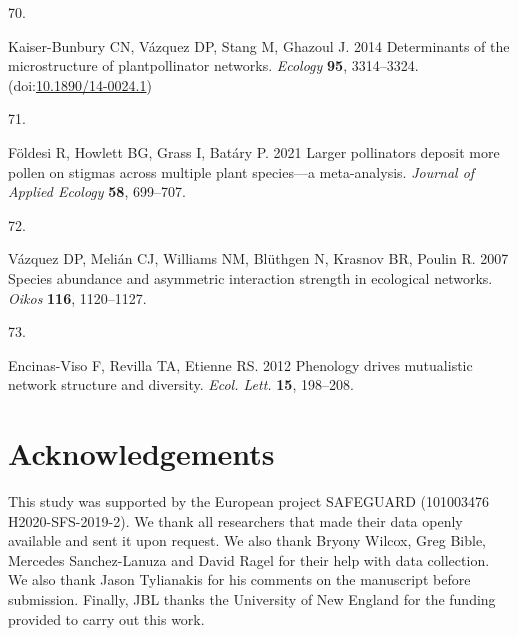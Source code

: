 \documentclass[
  12pt,
  a4paper,
]{article}
\newlength{\cslhangindent}
\newlength{\csllabelwidth}
\newlength{\cslentryspacingunit} %
\newenvironment{CSLReferences}[2] %
 {%
  \setlength{\parindent}{0pt}
  \ifodd #1
  \let\oldpar\par
  \def\par{\hangindent=\cslhangindent\oldpar}
  \fi
  \setlength{\parskip}{#2\cslentryspacingunit}
 }%
 {}
\newcommand{\CSLLeftMargin}[1]{\parbox[t]{\csllabelwidth}{#1}}
\newcommand{\CSLRightInline}[1]{\parbox[t]{\linewidth - \csllabelwidth}{#1}\break}
\begin{document}
\begin{CSLReferences}{0}{0}
\leavevmode{}%
\CSLLeftMargin{70. }
\CSLRightInline{Kaiser-Bunbury CN, Vázquez DP, Stang M, Ghazoul J. 2014 Determinants of the microstructure of plant\textendash pollinator networks. \emph{Ecology} \textbf{95}, 3314--3324. (doi:\href{https://doi.org/10.1890/14-0024.1}{10.1890/14-0024.1})}

\leavevmode{}%
\CSLLeftMargin{71. }
\CSLRightInline{Földesi R, Howlett BG, Grass I, Batáry P. 2021 Larger pollinators deposit more pollen on stigmas across multiple plant species---a meta-analysis. \emph{Journal of Applied Ecology} \textbf{58}, 699--707.}

\leavevmode{}%
\CSLLeftMargin{72. }
\CSLRightInline{Vázquez DP, Melián CJ, Williams NM, Blüthgen N, Krasnov BR, Poulin R. 2007 Species abundance and asymmetric interaction strength in ecological networks. \emph{Oikos} \textbf{116}, 1120--1127.}

\leavevmode{}%
\CSLLeftMargin{73. }
\CSLRightInline{Encinas-Viso F, Revilla TA, Etienne RS. 2012 Phenology drives mutualistic network structure and diversity. \emph{Ecol. Lett.} \textbf{15}, 198--208.}

\end{CSLReferences}

\hypertarget{acknowledgements}{%
\section{Acknowledgements}\label{acknowledgements}}

This study was supported by the European project SAFEGUARD (101003476 H2020-SFS-2019-2). We thank all researchers that made their data openly available and sent it upon request. We also thank Bryony Wilcox, Greg Bible, Mercedes Sanchez-Lanuza and David Ragel for their help with data collection. We also thank Jason Tylianakis for his comments on the manuscript before submission. Finally, JBL thanks the University of New England for the funding provided to carry out this work.

\singlespacing
\end{document}
